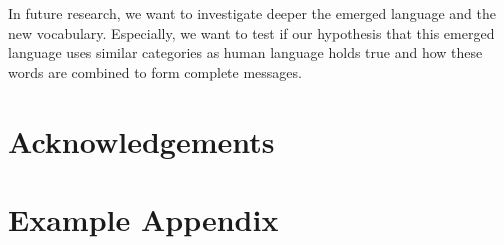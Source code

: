 \documentclass[11pt]{article}
\begin{document}
In future research, we want to investigate deeper the emerged language and the new vocabulary.
Especially, we want to test if our hypothesis that this emerged language uses similar categories as human language holds true and how these words are combined to form complete messages.

\section*{Acknowledgements}




\appendix

\section{Example Appendix}
\end{document}
